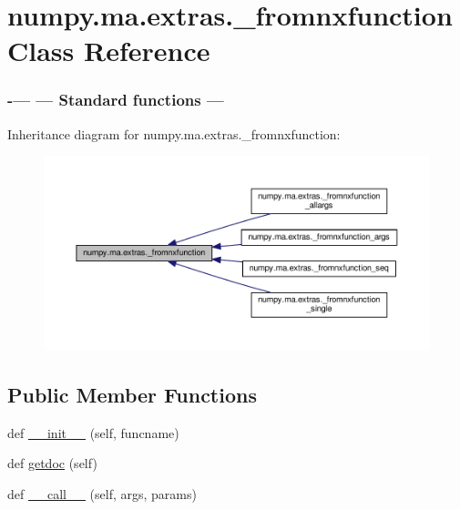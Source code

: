 \hypertarget{classnumpy_1_1ma_1_1extras_1_1__fromnxfunction}{}\section{numpy.\+ma.\+extras.\+\_\+fromnxfunction Class Reference}
\label{classnumpy_1_1ma_1_1extras_1_1__fromnxfunction}




 \subsubsection*{-\/--- --- Standard functions --- } 




Inheritance diagram for numpy.\+ma.\+extras.\+\_\+fromnxfunction\+:
\nopagebreak
\begin{figure}[H]
\begin{center}
\leavevmode
\includegraphics[width=350pt]{classnumpy_1_1ma_1_1extras_1_1__fromnxfunction__inherit__graph}
\end{center}
\end{figure}
\subsection*{Public Member Functions}
\begin{DoxyCompactItemize}
\item 
def \hyperlink{classnumpy_1_1ma_1_1extras_1_1__fromnxfunction_a59909adc640c395f317fe0e58a3a344e}{\+\_\+\+\_\+init\+\_\+\+\_\+} (self, funcname)
\item 
def \hyperlink{classnumpy_1_1ma_1_1extras_1_1__fromnxfunction_a6a5d4aa51ed9538931dbc5918d9e156a}{getdoc} (self)
\item 
def \hyperlink{classnumpy_1_1ma_1_1extras_1_1__fromnxfunction_aef93b45d04cbebd30b63328fe22f257c}{\+\_\+\+\_\+call\+\_\+\+\_\+} (self, args, params)
\end{DoxyCompactItemize}


